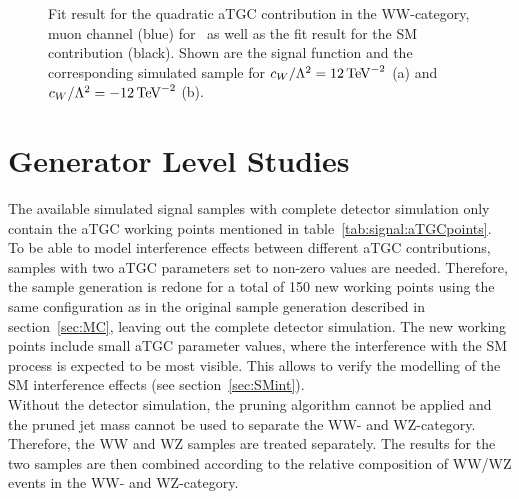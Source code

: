 \begin{figure}
	\centering
	\caption[Fit result for the quadratic aTGC contribution in the WW-category, muon channel]{Fit result for the quadratic aTGC contribution in the WW-category, muon channel (blue) for \Tccw \ as well as the fit result for the SM contribution (black). Shown are the signal function and the corresponding simulated sample for $c_{W}/\Lambda^2=12\,{\rm TeV}^{-2}$ (a) and $c_{W}/\Lambda^2=-12\,{\rm TeV}^{-2}$ (b).}
	\label{fig:signal:WW_mu_sig}
\end{figure}


\section{Generator Level Studies}
The available simulated signal samples with complete detector simulation only contain the aTGC working points mentioned in table~\ref{tab:signal:aTGCpoints}. To be able to model interference effects between different aTGC contributions, samples with two aTGC parameters set to non-zero values are needed. Therefore, the sample generation is redone for a total of 150 new working points using the same configuration as in the original sample generation described in section~\ref{sec:MC}, leaving out the complete detector simulation. The new working points include small aTGC parameter values, where the interference with the SM process is expected to be most visible. This allows to verify the modelling of the SM interference effects (see section~\ref{sec:SMint}).\\

\noindent Without the detector simulation, the pruning algorithm cannot be applied and the pruned jet mass cannot be used to separate the WW- and WZ-category. Therefore, the WW and WZ samples are treated separately. The results for the two samples are then combined according to the relative composition of WW/WZ events in the WW- and WZ-category.  
